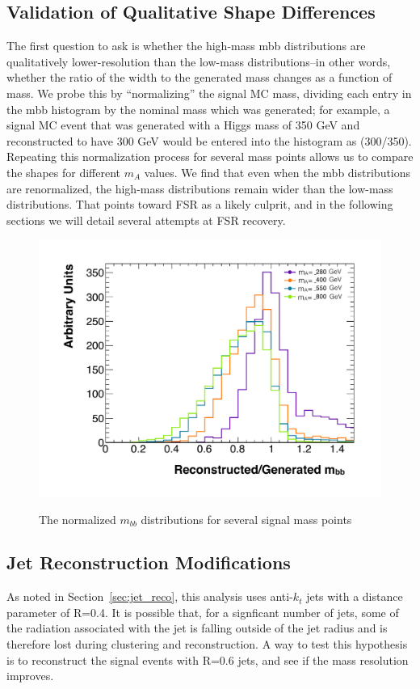 \subsection{Validation of Qualitative Shape Differences}
The first question to ask is whether the high-mass mbb distributions are qualitatively lower-resolution than
the low-mass distributions–in other words, whether the ratio of the width to the generated mass changes
as a function of mass. We probe this by “normalizing” the signal MC mass, dividing each entry in the mbb
histogram by the nominal mass which was generated; for example, a signal MC event that was generated
with a Higgs mass of 350 GeV and reconstructed to have 300 GeV would be entered into the histogram
as (300/350). Repeating this normalization process for several mass points allows us to compare the
shapes for different $m_A$ values.
We find that even when the mbb distributions are renormalized, the high-mass distributions remain
wider than the low-mass distributions. That points toward FSR as a likely culprit, and in the following
sections we will detail several attempts at FSR recovery.
\begin{figure}[hbt]
  \includegraphics[width=0.78\linewidth]{SignalKin/mbb_normalized_signal.pdf}
  \label{fig:mbb_norm}
  \caption{The normalized $m_{bb}$ distributions for several signal mass points}
\end{figure}





\subsection{Jet Reconstruction Modifications}
As noted in Section~\ref{sec:jet_reco}, this analysis uses anti-$k_t$ jets with a distance parameter
of R=0.4.  It is possible that, for a signficant number of jets, some of the radiation associated
with the jet is falling outside of the jet radius and is therefore lost during clustering and
reconstruction.  A way to test this hypothesis is to reconstruct the signal events with R=0.6
jets, and see if the mass resolution improves. 

